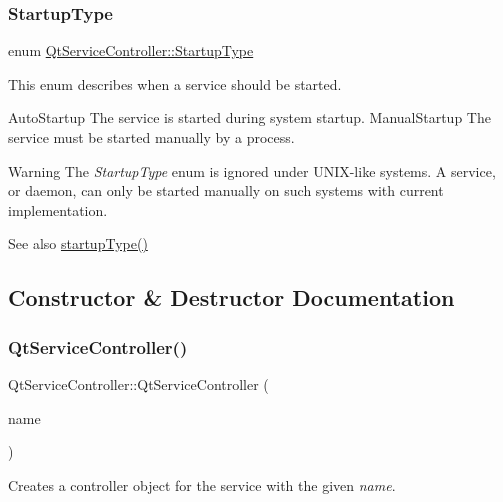 \subsubsection{\texorpdfstring{Startup\+Type}{StartupType}}
{\footnotesize\ttfamily enum \hyperlink{class_qt_service_controller_a946ac2b079d9760503da923c2eaf0aac}{Qt\+Service\+Controller\+::\+Startup\+Type}}

This enum describes when a service should be started.

Auto\+Startup The service is started during system startup.  Manual\+Startup The service must be started manually by a process.

\begin{DoxyWarning}{Warning}
The {\itshape Startup\+Type} enum is ignored under U\+N\+I\+X-\/like systems. A service, or daemon, can only be started manually on such systems with current implementation.
\end{DoxyWarning}
\begin{DoxySeeAlso}{See also}
\hyperlink{class_qt_service_controller_acfd3b5cb23c17bf415f1d606b8461109}{startup\+Type()} 
\end{DoxySeeAlso}


\subsection{Constructor \& Destructor Documentation}
\mbox{\label{class_qt_service_controller_ab5c5bb7d168d2e59f0784ded380d7adf}} 
\subsubsection{\texorpdfstring{Qt\+Service\+Controller()}{QtServiceController()}}
{\footnotesize\ttfamily Qt\+Service\+Controller\+::\+Qt\+Service\+Controller (\begin{DoxyParamCaption}\item[{const Q\+String \&}]{name }\end{DoxyParamCaption})}

Creates a controller object for the service with the given {\itshape name}. \mbox{\label{class_qt_service_controller_a3288eead2b9862c3a70e7decbaebc908}} 
